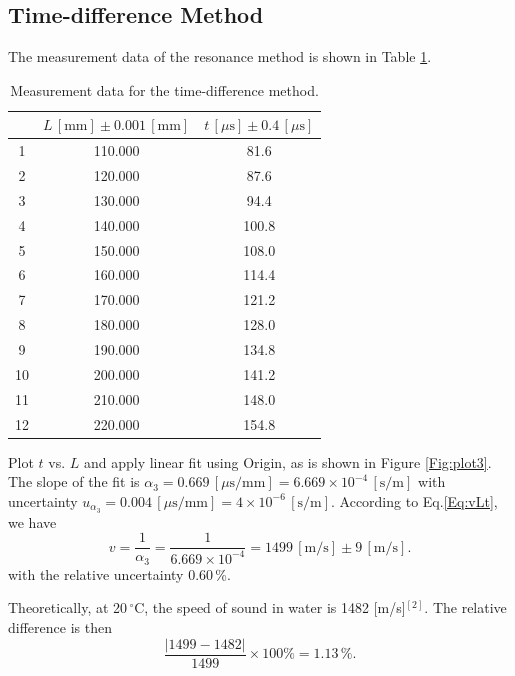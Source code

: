 \documentclass[a4paper]{article}
\begin{document}
\subsection{Time-difference Method}

The measurement data of the resonance method is shown in Table \ref{Tab:Timdi}.

\begin{table}[htbp]
\centering
\begin{tabular}{ccc}
\hline
  & $L\, [\text{mm}] \pm 0.001\, [\text{mm}]$ & $t\,[\mu\text{s}] \pm 0.4\,[\mu\text{s}]$\\
\hline
1 & 110.000 & 81.6\\
2 & 120.000 & 87.6\\
3 & 130.000 & 94.4\\
4 & 140.000 & 100.8 \\
5 & 150.000 & 108.0\\
6 & 160.000 & 114.4\\
7 & 170.000 & 121.2\\
8 & 180.000 & 128.0\\
9 & 190.000 & 134.8\\
10 & 200.000 & 141.2\\
11 & 210.000 & 148.0\\
12 & 220.000 & 154.8\\
\hline
\end{tabular}
\caption{Measurement data for the time-difference method.}\label{Tab:Timdi}
\end{table}

Plot $t$ vs. $L$ and apply linear fit using Origin, as is shown in Figure \ref{Fig:plot3}. The slope of the fit is $\alpha_3 = 0.669\,[\mu\text{s/mm}] = 6.669 \times 10^{-4}\,[\text{s/m}]$ with uncertainty $u_{\alpha_3} = 0.004\,[\mu\text{s/mm}] = 4 \times 10^{-6}\,[\text{s/m}]$. According to Eq.\ref{Eq:vLt}, we have
\begin{equation}\label{Eq:caloftim}
v = \frac{1}{\alpha_3} = \frac{1}{6.669 \times 10^{-4}} = 1499\,[\text{m/s}] \pm 9\,[\text{m/s}].
\end{equation}
with the relative uncertainty 0.60\,\%.

Theoretically, at 20\,$^{\circ}$C, the speed of sound in water is 1482 [m/s]$^{[2]}$. The relative difference is then
\[\frac{|1499 - 1482|}{1499} \times 100\% = 1.13\,\%.\]
\end{document}
